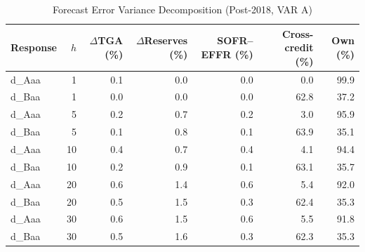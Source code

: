 \begin{table}[htbp]
\centering
\caption{Forecast Error Variance Decomposition (Post-2018, VAR A)} 
\label{tab:var_fevd}
\begin{tabular}{lrrrrrr}
  \toprule
Response & $h$ & $\Delta$TGA (\%) & $\Delta$Reserves (\%) & SOFR--EFFR (\%) & Cross-credit (\%) & Own (\%) \\
  \midrule
d\_Aaa & 1 & 0.1 & 0.0 & 0.0 & 0.0 & 99.9 \\
  d\_Baa & 1 & 0.0 & 0.0 & 0.0 & 62.8 & 37.2 \\
  d\_Aaa & 5 & 0.2 & 0.7 & 0.2 & 3.0 & 95.9 \\
  d\_Baa & 5 & 0.1 & 0.8 & 0.1 & 63.9 & 35.1 \\
  d\_Aaa & 10 & 0.4 & 0.7 & 0.4 & 4.1 & 94.4 \\
  d\_Baa & 10 & 0.2 & 0.9 & 0.1 & 63.1 & 35.7 \\
  d\_Aaa & 20 & 0.6 & 1.4 & 0.6 & 5.4 & 92.0 \\
  d\_Baa & 20 & 0.5 & 1.5 & 0.3 & 62.4 & 35.3 \\
  d\_Aaa & 30 & 0.6 & 1.5 & 0.6 & 5.5 & 91.8 \\
  d\_Baa & 30 & 0.5 & 1.6 & 0.3 & 62.3 & 35.3 \\
   \bottomrule
\end{tabular}
\end{table}
